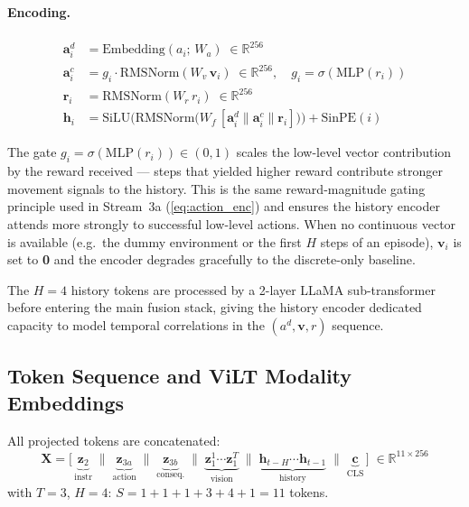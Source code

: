 \documentclass{article}
\begin{document}
\paragraph{Encoding.}
\begin{align}
  \mathbf{a}_i^{d} &= \mathrm{Embedding}(a_i;\,W_a)
                      \;\in\mathbb{R}^{256}
  \label{eq:a_emb}\\
  \mathbf{a}_i^{c} &= g_i \cdot \mathrm{RMSNorm}(W_v\,\mathbf{v}_i)
                      \;\in\mathbb{R}^{256}, \quad
                      g_i = \sigma(\mathrm{MLP}(r_i))
  \label{eq:a_lowlevel}\\
  \mathbf{r}_i     &= \mathrm{RMSNorm}(W_r\,r_i)
                      \;\in\mathbb{R}^{256}
  \label{eq:r_proj}\\
  \mathbf{h}_i     &= \mathrm{SiLU}\!\bigl(
      \mathrm{RMSNorm}\bigl(
        W_f\,[\mathbf{a}_i^{d}\|\mathbf{a}_i^{c}\|\mathbf{r}_i]
      \bigr)
    \bigr) + \mathrm{SinPE}(i)
  \label{eq:hist_tok}
\end{align}

The gate $g_i = \sigma(\mathrm{MLP}(r_i))\!\in\!(0,1)$ scales the low-level
vector contribution by the reward received — steps that yielded higher reward
contribute stronger movement signals to the history.
This is the same reward-magnitude gating principle used in Stream~3a
(\cref{eq:action_enc}) and ensures the history encoder attends more strongly
to successful low-level actions.
When no continuous vector is available (e.g.\ the dummy environment or the
first $H$ steps of an episode), $\mathbf{v}_i$ is set to \textbf{0} and the
encoder degrades gracefully to the discrete-only baseline.

The $H{=}4$ history tokens are processed by a 2-layer LLaMA sub-transformer
before entering the main fusion stack, giving the history encoder dedicated
capacity to model temporal correlations in the
$(a^d, \mathbf{v}, r)$ sequence.

\subsection{Token Sequence and ViLT Modality Embeddings}
\label{sec:tokens}

All projected tokens are concatenated:
\begin{equation}
  \mathbf{X} = \bigl[\,
    \underbrace{\mathbf{z}_2}_{\mathrm{instr}} \;\|\;
    \underbrace{\mathbf{z}_{3a}}_{\mathrm{action}} \;\|\;
    \underbrace{\mathbf{z}_{3b}}_{\mathrm{conseq.}} \;\|\;
    \underbrace{\mathbf{z}_1^1\cdots\mathbf{z}_1^T}_{\mathrm{vision}} \;\|\;
    \underbrace{\mathbf{h}_{t-H}\cdots\mathbf{h}_{t-1}}_{\mathrm{history}} \;\|\;
    \underbrace{\mathbf{c}}_{\mathrm{CLS}}
  \,\bigr] \;\in\mathbb{R}^{11\times256}
  \label{eq:sequence}
\end{equation}
with $T{=}3$, $H{=}4$: $S = 1{+}1{+}1{+}3{+}4{+}1 = 11$ tokens.
\end{document}
